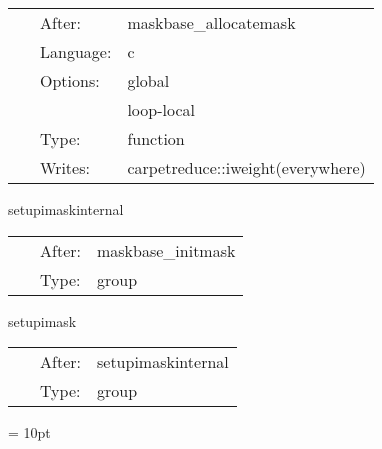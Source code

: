\hspace{5mm}

 \begin{tabular*}{160mm}{cll} 
~ & After:  & maskbase\_allocatemask \\ 
~ & Language:  & c \\ 
~ & Options:  & global \\ 
~& ~ &loop-local\\ 
~ & Type:  & function \\ 
~ & Writes:  & carpetreduce::iweight(everywhere) \\ 
\end{tabular*} 


\vspace{5mm}


\hspace{5mm} setupimaskinternal 

\hspace{5mm}{\it set up the integer weight function (schedule other routines in here) } 


\hspace{5mm}

 \begin{tabular*}{160mm}{cll} 
~ & After:  & maskbase\_initmask \\ 
~ & Type:  & group \\ 
\end{tabular*} 


\vspace{5mm}


\hspace{5mm} setupimask 

\hspace{5mm}{\it set up the integer weight function (schedule other routines in here) } 


\hspace{5mm}

 \begin{tabular*}{160mm}{cll} 
~ & After:  & setupimaskinternal \\ 
~ & Type:  & group \\ 
\end{tabular*} 



\vspace{5mm}\parskip = 10pt 
